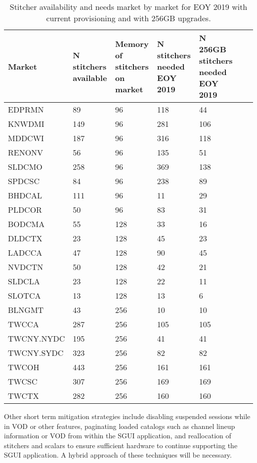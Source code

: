 \documentclass{article}
\begin{document}
\begin{table}
\begin{tabular}{|l|p{17mm}|p{17mm}|p{17mm}|p{17mm}|p{17mm}|p{17mm}|} 
\hline Market & N stitchers available & Memory of stitchers on market & N stitchers needed EOY 2019 & N 256GB stitchers needed EOY 2019 \\
\hline EDPRMN & 89 & 96 & 118 & 44 \\
\hline KNWDMI & 149 & 96 & 281 & 106 \\
\hline MDDCWI & 187 & 96 & 316 & 118 \\
\hline RENONV & 56 & 96 & 135 & 51 \\
\hline SLDCMO & 258 & 96 & 369 & 138 \\
\hline SPDCSC & 84 & 96 & 238 & 89 \\
\hline BHDCAL & 111 & 96 & 11 & 29 \\
\hline PLDCOR & 50 & 96 & 83 & 31 \\
\hline BODCMA & 55 & 128 & 33 & 16 \\
\hline DLDCTX & 23 & 128 & 45 & 23 \\
\hline LADCCA & 47 & 128 & 90 & 45 \\
\hline NVDCTN & 50 & 128 & 42 & 21 \\
\hline SLDCLA & 23 & 128 & 22 & 11 \\
\hline SLOTCA & 13 & 128 & 13 & 6 \\
\hline BLNGMT & 43 & 256 & 10 & 10 \\
\hline TWCCA & 287 & 256 & 105 & 105 \\
\hline TWCNY.NYDC & 195 & 256 & 41 & 41 \\
\hline TWCNY.SYDC & 323 & 256 & 82 & 82 \\
\hline TWCOH & 443 & 256 & 161 & 161 \\
\hline TWCSC & 307 & 256 & 169 & 169 \\
\hline TWCTX & 282 & 256 & 160 & 160 \\
\hline 
\end{tabular}
\caption{\label{TABLE-StitchersNeeded2019}Stitcher availability and needs market by market for EOY 2019 with current provisioning and with 256GB upgrades.} 
\end{table}

Other short term mitigation strategies include disabling suspended sessions while in VOD or other features, paginating loaded catalogs such as channel lineup information or VOD from within the SGUI application, and reallocation of stitchers and scalars to ensure sufficient hardware to continue supporting the SGUI application. A hybrid approach of these techniques will be necessary. 
\end{document}
